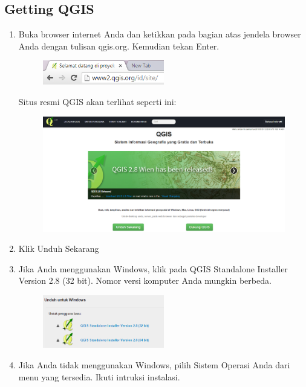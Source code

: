 \subsection{Getting QGIS}
\begin{enumerate}
\item
Buka browser internet Anda dan ketikkan pada bagian atas jendela browser Anda dengan tulisan qgis.org. Kemudian tekan Enter.
\begin{figure}[ht]
	    \centerline{\includegraphics[width=0.50\textwidth]{figures/image1}}
	    \end{figure}

Situs resmi QGIS akan terlihat seperti ini:
\begin{figure}[ht]
	    \centerline{\includegraphics[width=1.00\textwidth]{figures/image2}}
	    \end{figure}
\item
Klik Unduh Sekarang
\item
Jika Anda menggunakan Windows, klik pada QGIS Standalone Installer Version 2.8 (32 bit). Nomor versi komputer Anda mungkin berbeda.
\begin{figure}[ht]
	    \centerline{\includegraphics[width=0.50\textwidth]{figures/image3}}
	    \end{figure}
\item
Jika Anda tidak menggunakan Windows, pilih Sistem Operasi Anda dari menu yang tersedia. Ikuti intruksi instalasi.

\end{enumerate}

